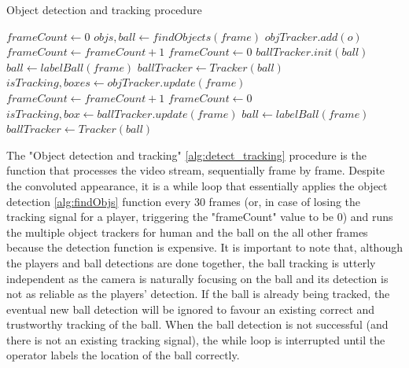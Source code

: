 \documentclass[
    11pt,
    oneside
]{report}
\begin{document}
\begin{algorithm}[H]
\begin{algorithmic}
\caption{Object detection and tracking procedure}\label{alg:detect_tracking}
\State $frameCount \gets 0$
        \State $objs, ball \gets findObjects(frame)$
                \State $objTracker.add(o)$
            \EndFor
            \State $frameCount \gets frameCount + 1$
        \Else
            \State $frameCount \gets 0$
        \EndIf
            \State $ballTracker.init(ball)$
        \Else
            \State $ball \gets labelBall(frame)$
            \State $ballTracker \gets Tracker(ball)$
        \EndIf
    \Else
        \State $isTracking, boxes \gets objTracker.update(frame)$
            \State $frameCount \gets frameCount + 1$
        \Else
            \State $frameCount \gets 0$
        \EndIf
        \State $isTracking, box \gets ballTracker.update(frame)$
            \State $ball \gets labelBall(frame)$
            \State $ballTracker \gets Tracker(ball)$
        \EndIf
    \EndIf
\EndFor
\end{algorithmic}
\end{algorithm}




The "Object detection and tracking" \ref{alg:detect_tracking} procedure is the function that processes the video stream, sequentially frame by frame. Despite the convoluted appearance, it is a while loop that essentially applies the object detection \ref{alg:findObjs} function every 30 frames (or, in case of losing the tracking signal for a player, triggering the "frameCount" value to be 0) and runs the multiple object trackers for human and the ball on the all other frames because the detection function is expensive. It is important to note that, although the players and ball detections are done together, the ball tracking is utterly independent as the camera is naturally focusing on the ball and its detection is not as reliable as the players' detection. If the ball is already being tracked, the eventual new ball detection will be ignored to favour an existing correct and trustworthy tracking of the ball. When the ball detection is not successful (and there is not an existing tracking signal), the while loop is interrupted until the operator labels the location of the ball correctly.
\end{document}
